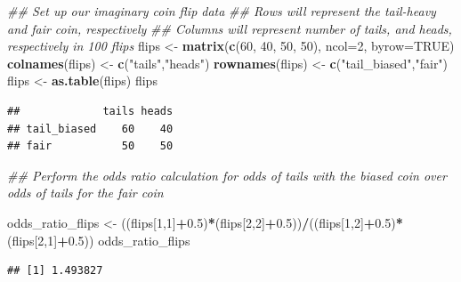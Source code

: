 \documentclass[]{book}
\newenvironment{Shaded}{\begin{snugshade}}{\end{snugshade}}
\newcommand{\CommentTok}[1]{\textcolor[rgb]{0.56,0.35,0.01}{\textit{#1}}}
\newcommand{\DataTypeTok}[1]{\textcolor[rgb]{0.13,0.29,0.53}{#1}}
\newcommand{\DecValTok}[1]{\textcolor[rgb]{0.00,0.00,0.81}{#1}}
\newcommand{\FloatTok}[1]{\textcolor[rgb]{0.00,0.00,0.81}{#1}}
\newcommand{\KeywordTok}[1]{\textcolor[rgb]{0.13,0.29,0.53}{\textbf{#1}}}
\newcommand{\NormalTok}[1]{#1}
\newcommand{\OperatorTok}[1]{\textcolor[rgb]{0.81,0.36,0.00}{\textbf{#1}}}
\newcommand{\OtherTok}[1]{\textcolor[rgb]{0.56,0.35,0.01}{#1}}
\newcommand{\StringTok}[1]{\textcolor[rgb]{0.31,0.60,0.02}{#1}}
\begin{document}
\begin{Shaded}
\begin{Highlighting}[]
\CommentTok{## Set up our imaginary coin flip data}
\CommentTok{## Rows will represent the tail-heavy and fair coin, respectively}
\CommentTok{## Columns will represent number of tails, and heads, respectively in 100 flips}
\NormalTok{flips <-}\StringTok{ }\KeywordTok{matrix}\NormalTok{(}\KeywordTok{c}\NormalTok{(}\DecValTok{60}\NormalTok{, }\DecValTok{40}\NormalTok{, }\DecValTok{50}\NormalTok{, }\DecValTok{50}\NormalTok{), }\DataTypeTok{ncol=}\DecValTok{2}\NormalTok{, }\DataTypeTok{byrow=}\OtherTok{TRUE}\NormalTok{)}
\KeywordTok{colnames}\NormalTok{(flips) <-}\StringTok{ }\KeywordTok{c}\NormalTok{(}\StringTok{"tails"}\NormalTok{,}\StringTok{"heads"}\NormalTok{)}
\KeywordTok{rownames}\NormalTok{(flips) <-}\StringTok{ }\KeywordTok{c}\NormalTok{(}\StringTok{"tail_biased"}\NormalTok{,}\StringTok{"fair"}\NormalTok{)}
\NormalTok{flips <-}\StringTok{ }\KeywordTok{as.table}\NormalTok{(flips)}
\NormalTok{flips}
\end{Highlighting}
\end{Shaded}

\begin{verbatim}
##             tails heads
## tail_biased    60    40
## fair           50    50
\end{verbatim}

\begin{Shaded}
\begin{Highlighting}[]
\CommentTok{## Perform the odds ratio calculation for odds of tails with the biased coin over odds of tails for the fair coin}

\NormalTok{odds_ratio_flips <-}\StringTok{ }\NormalTok{((flips[}\DecValTok{1}\NormalTok{,}\DecValTok{1}\NormalTok{]}\OperatorTok{+}\FloatTok{0.5}\NormalTok{)}\OperatorTok{*}\NormalTok{(flips[}\DecValTok{2}\NormalTok{,}\DecValTok{2}\NormalTok{]}\OperatorTok{+}\FloatTok{0.5}\NormalTok{))}\OperatorTok{/}\NormalTok{((flips[}\DecValTok{1}\NormalTok{,}\DecValTok{2}\NormalTok{]}\OperatorTok{+}\FloatTok{0.5}\NormalTok{)}\OperatorTok{*}\NormalTok{(flips[}\DecValTok{2}\NormalTok{,}\DecValTok{1}\NormalTok{]}\OperatorTok{+}\FloatTok{0.5}\NormalTok{))}
\NormalTok{odds_ratio_flips}
\end{Highlighting}
\end{Shaded}

\begin{verbatim}
## [1] 1.493827
\end{verbatim}
\end{document}
